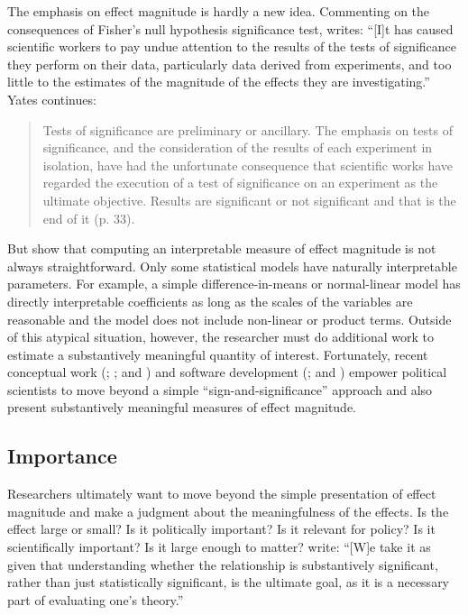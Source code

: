 \documentclass[12pt]{article}
\begin{document}
The emphasis on effect magnitude is hardly a new idea. Commenting on the consequences of Fisher's null hypothesis significance test, \citet[p. 32]{Yates1951} writes: ``[I]t has caused scientific workers to pay undue attention to the results of the tests of significance they perform on their data, particularly data derived from experiments, and too little to the estimates of the magnitude of the effects they are investigating.'' Yates continues: 

\begin{quote}
Tests of significance are preliminary or ancillary. The emphasis on tests of significance, and the consideration of the results of each experiment in isolation, have had the unfortunate consequence that scientific works have regarded the execution of a test of significance on an experiment as the ultimate objective. Results are significant or not significant and that is the end of it (p. 33).
\end{quote}

But \cite{KingTomzWittenberg2000} show that computing an interpretable measure of effect magnitude is not always straightforward. Only some statistical models have naturally interpretable parameters. For example, a simple difference-in-means or normal-linear model has directly interpretable coefficients as long as the scales of the variables are reasonable and the model does not include non-linear or product terms. Outside of this atypical situation, however, the researcher must do additional work to estimate a substantively meaningful quantity of interest. Fortunately, recent conceptual work (\citealt{KingTomzWittenberg2000}; \citealt{BerryDeMerittEsarey2010}; and \citealt{HanmerKalkan2013}) and software development (\citealt{TomzWittenbergKing2003}; and \citealt{ImaiKingLau2007}) empower political scientists to move beyond a simple ``sign-and-significance'' approach and also present substantively meaningful measures of effect magnitude. 

\subsection*{Importance}

Researchers ultimately want to move beyond the simple presentation of effect magnitude and make a judgment about the meaningfulness of the effects. Is the effect large or small? Is it politically important? Is it relevant for policy? Is it scientifically important? Is it large enough to matter? \citet[p. 264]{HanmerKalkan2013} write: ``[W]e take it as given that understanding whether the relationship is substantively significant, rather than just statistically significant, is the ultimate goal, as it is a necessary part of evaluating one's theory.''
\end{document}
